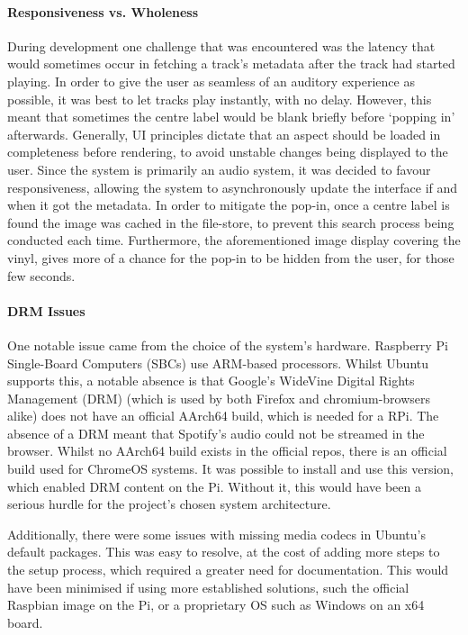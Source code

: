                 \paragraph{Responsiveness vs. Wholeness} During development one challenge that was encountered was the latency that would sometimes occur in fetching a track's metadata after the track had started playing. In order to give the user as seamless of an auditory experience as possible, it was best to let tracks play instantly, with no delay. However, this meant that sometimes the centre label would be blank briefly before `popping in' afterwards. Generally, UI principles dictate that an aspect should be loaded in completeness before rendering, to avoid unstable changes being displayed to the user. Since the system is primarily an audio system, it was decided to favour responsiveness, allowing the system to asynchronously update the interface if and when it got the metadata. In order to mitigate the pop-in, once a centre label is found the image was cached in the file-store, to prevent this search process being conducted each time. Furthermore, the aforementioned image display covering the vinyl, gives more of a chance for the pop-in to be hidden from the user, for those few seconds.
    
                \paragraph{DRM Issues} One notable issue came from the choice of the system's hardware. Raspberry Pi Single-Board Computers (SBCs) use ARM-based processors. Whilst Ubuntu supports this, a notable absence is that Google's WideVine Digital Rights Management (DRM) (which is used by both Firefox and chromium-browsers alike) does not have an official AArch64 build, which is needed for a RPi. The absence of a DRM meant that Spotify's audio could not be streamed in the browser. Whilst no AArch64 build exists in the official repos, there is an official build used for ChromeOS systems. It was possible to install and use this version, which enabled DRM content on the Pi. Without it, this would have been a serious hurdle for the project's chosen system architecture.
    
                Additionally, there were some issues with missing media codecs in Ubuntu's default packages. This was easy to resolve, at the cost of adding more steps to the setup process, which required a greater need for documentation. This would have been minimised if using more established solutions, such the official Raspbian image on the Pi, or a proprietary OS such as Windows on an x64 board.
    
